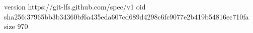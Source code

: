 version https://git-lfs.github.com/spec/v1
oid sha256:37965bb3b34360bf6a435eda607cd689d4298c6fc9077e2b419b54816ec710fa
size 970
